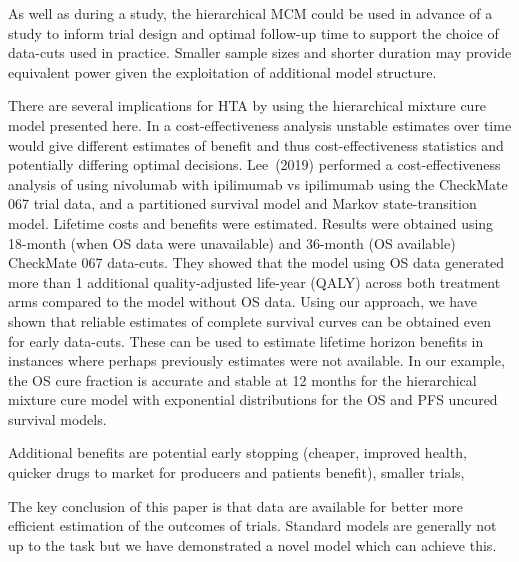 \documentclass[AMA,STIX1COL]{WileyNJD-v2}
\begin{document}
As well as during a study, the hierarchical MCM could be used in advance of a study to inform trial design and optimal follow-up time to support the choice of data-cuts used in practice. Smaller sample sizes and shorter duration may provide equivalent power given the exploitation of additional model structure.

There are several implications for HTA by using the hierarchical mixture cure model presented here.
In a cost-effectiveness analysis unstable estimates over time would give different estimates of benefit and thus cost-effectiveness statistics and potentially differing optimal decisions.
Lee~(2019)\cite{Lee2019} performed a cost-effectiveness analysis of using nivolumab with ipilimumab vs ipilimumab using the CheckMate 067 trial data, and a partitioned survival model and Markov state-transition model. Lifetime costs and benefits were estimated.
Results were obtained using 18-month (when OS data were unavailable) and 36-month (OS available) CheckMate 067 data-cuts. They showed that the model using OS data generated more than 1 additional quality-adjusted life-year (QALY) across both treatment arms compared to the model without OS data.
Using our approach, we have shown that reliable estimates of complete survival curves can be obtained even for early data-cuts. These can be used to estimate lifetime horizon benefits in instances where perhaps previously estimates were not available.
In our example, the OS cure fraction is accurate and stable at 12 months for the hierarchical mixture cure model with exponential distributions for the OS and PFS uncured survival models.

Additional benefits are potential early stopping (cheaper, improved health, quicker drugs to market for producers and patients benefit),
smaller trials,

The key conclusion of this paper is that data are available for better more efficient estimation of the outcomes of trials. Standard models are generally not up to the task but we have demonstrated a novel model which can achieve this.


\end{document}
